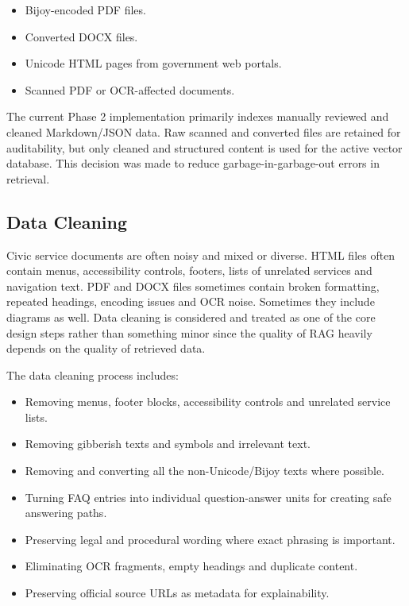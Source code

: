 \documentclass[12pt,oneside,openany]{report}
\begin{document}
\begin{itemize}
    \item Bijoy-encoded PDF files.
    \item Converted DOCX files.
    \item Unicode HTML pages from government web portals.
    \item Scanned PDF or OCR-affected documents.
\end{itemize}

The current Phase 2 implementation primarily indexes manually reviewed and cleaned Markdown/JSON data. Raw scanned and converted files are retained for auditability, but only cleaned and structured content is used for the active vector database. This decision was made to reduce garbage-in-garbage-out errors in retrieval.

\subsection{Data Cleaning}

Civic service documents are often noisy and mixed or diverse. HTML files often contain menus, accessibility controls, footers, lists of unrelated services and navigation text. PDF and DOCX files sometimes contain broken formatting, repeated headings, encoding issues and OCR noise. Sometimes they include diagrams as well. Data cleaning is considered and treated as one of the core design steps rather than something minor since the quality of RAG heavily depends on the quality of retrieved data.

The data cleaning process includes:

\begin{itemize}
    \item Removing menus, footer blocks, accessibility controls and unrelated service lists.
    \item Removing gibberish texts and symbols and irrelevant text.
    \item Removing and converting all the non-Unicode/Bijoy texts where possible.
    \item Turning FAQ entries into individual question-answer units for creating safe answering paths.
    \item Preserving legal and procedural wording where exact phrasing is important.
    \item Eliminating OCR fragments, empty headings and duplicate content.
    \item Preserving official source URLs as metadata for explainability.
\end{itemize}
\end{document}
